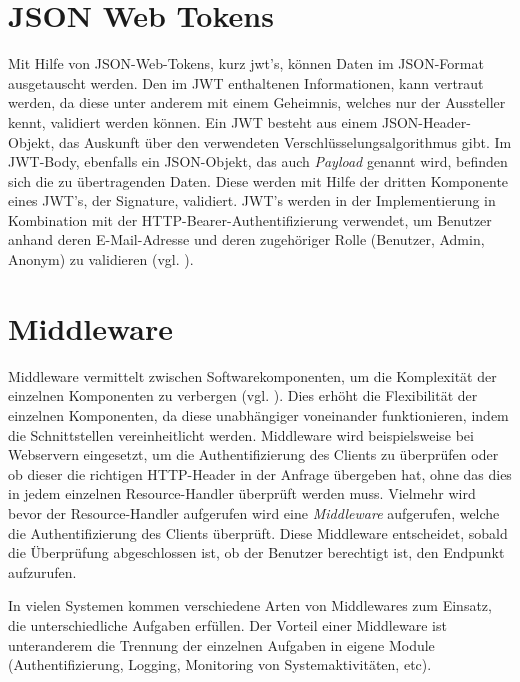 \section{JSON Web Tokens}\label{sec:theory:jwt}
Mit Hilfe von JSON-Web-Tokens, kurz \acrshort{jwt}'s, können Daten im JSON-Format ausgetauscht werden. Den im JWT enthaltenen Informationen, kann vertraut werden, da diese unter anderem mit einem Geheimnis, welches nur der Aussteller kennt, validiert werden können. Ein JWT besteht aus einem JSON-Header-Objekt, das Auskunft über den verwendeten Verschlüsselungsalgorithmus gibt. Im JWT-Body, ebenfalls ein JSON-Objekt, das auch \textit{Payload} genannt wird, befinden sich die zu übertragenden Daten. Diese werden mit Hilfe der dritten Komponente eines JWT's, der Signature, validiert. JWT's werden in der Implementierung in Kombination mit der HTTP-Bearer-Authentifizierung verwendet, um Benutzer anhand deren E-Mail-Adresse und deren zugehöriger Rolle (Benutzer, Admin, Anonym) zu validieren (vgl. \cite{src:jwt}).    


\section{Middleware}\label{sec:theory:middleware}
Middleware vermittelt zwischen Softwarekomponenten, um die Komplexität der einzelnen Komponenten zu verbergen (vgl. \cite{wiki:middleware}). Dies erhöht die Flexibilität der einzelnen Komponenten, da diese unabhängiger voneinander funktionieren, indem die Schnittstellen vereinheitlicht werden. Middleware wird beispielsweise bei Webservern eingesetzt, um die Authentifizierung des Clients zu überprüfen oder ob dieser die richtigen HTTP-Header in der Anfrage übergeben hat, ohne das dies in jedem einzelnen Resource-Handler überprüft werden muss. Vielmehr wird bevor der Resource-Handler aufgerufen wird eine \textit{Middleware} aufgerufen, welche die Authentifizierung des Clients überprüft. Diese Middleware entscheidet, sobald die Überprüfung abgeschlossen ist, ob der Benutzer berechtigt ist, den Endpunkt aufzurufen.\bigskip

\noindent
In vielen Systemen kommen verschiedene Arten von Middlewares zum Einsatz, die unterschiedliche Aufgaben erfüllen. Der Vorteil einer Middleware ist unteranderem die Trennung der einzelnen Aufgaben in eigene Module (Authentifizierung, Logging, Monitoring von Systemaktivitäten, etc). 